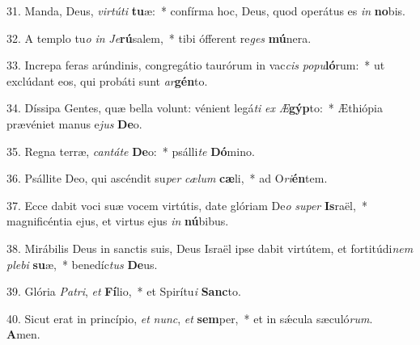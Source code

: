 31. Manda, Deus, \textit{vir}\textit{tú}\textit{ti} \textbf{tu}æ:~*  confírma hoc, Deus, quod operátus es \textit{in} \textbf{no}bis.\

32. A templo tu\textit{o} \textit{in} \textit{Je}\textbf{rú}salem,~*  tibi ófferent re\textit{ges} \textbf{mú}nera.\

33. Increpa feras arúndinis, congregátio taurórum in vac\textit{cis} \textit{po}\textit{pu}\textbf{ló}rum:~*  ut exclúdant eos, qui probáti sunt \textit{ar}\textbf{gén}to.\

34. Díssipa Gentes, quæ bella volunt: vénient legá\textit{ti} \textit{ex} \textit{Æ}\textbf{gýp}to:~*  Æthiópia prævéniet manus e\textit{jus} \textbf{De}o.\

35. Regna terræ, \textit{can}\textit{tá}\textit{te} \textbf{De}o:~*  psálli\textit{te} \textbf{Dó}mino.\

36. Psállite Deo, qui ascéndit su\textit{per} \textit{cæ}\textit{lum} \textbf{cæ}li,~*  ad O\textit{ri}\textbf{én}tem.\

37. Ecce dabit voci suæ vocem virtútis, date glóriam De\textit{o} \textit{su}\textit{per} \textbf{Is}raël,~*  magnificéntia ejus, et virtus ejus \textit{in} \textbf{nú}bibus.\

38. Mirábilis Deus in sanctis suis, Deus Israël ipse dabit virtútem, et fortitúdi\textit{nem} \textit{ple}\textit{bi} \textbf{su}æ,~*  benedíc\textit{tus} \textbf{De}us.\

39. Glória \textit{Pa}\textit{tri}, \textit{et} \textbf{Fí}lio,~*  et Spirítu\textit{i} \textbf{Sanc}to.\

40. Sicut erat in princípio, \textit{et} \textit{nunc}, \textit{et} \textbf{sem}per,~*  et in sǽcula sæculó\textit{rum}. \textbf{A}men.\

